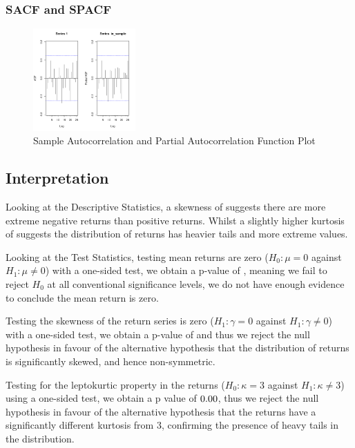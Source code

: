 \documentclass{article}
\begin{document}
\subsubsection*{SACF and SPACF}

\begin{figure}[H]
    \centering
    \includegraphics[width=0.35\textwidth]{../../docs/figures/PACF.png}
    \caption{Sample Autocorrelation and Partial Autocorrelation Function Plot}
    \label{fig:pacf}
\end{figure}

\subsection*{Interpretation}
Looking at the Descriptive Statistics, a skewness of \askew suggests there are more extreme negative returns than positive returns. 
Whilst a slightly higher kurtosis of \akurt suggests the distribution of returns has heavier tails and more extreme values.

Looking at the Test Statistics, testing mean returns are zero ($H_0 : \mu =0$ against $H_1 : \mu \neq 0$) with a one-sided test, we obtain a p-value of \amup, meaning we fail to reject $H_0$ at all conventional significance levels, we do not have enough evidence to conclude the mean return is zero. 

Testing the skewness of the return series is zero ($ H_1: \gamma = 0$ against $H_1 : \gamma \neq 0$) with a one-sided test, we obtain a p-value of \askewp and thus we reject the null hypothesis in favour of the alternative hypothesis that the distribution of returns is significantly skewed, and hence non-symmetric. 

Testing for the leptokurtic property in the returns ($H_0 : \kappa = 3$ against $H_1 : \kappa \neq 3 $) using a one-sided test, we obtain a p value of $0.00$, thus we reject the null hypothesis in favour of the alternative hypothesis that the returns have a significantly different kurtosis from 3, confirming the presence of heavy tails in the distribution. 
\end{document}
